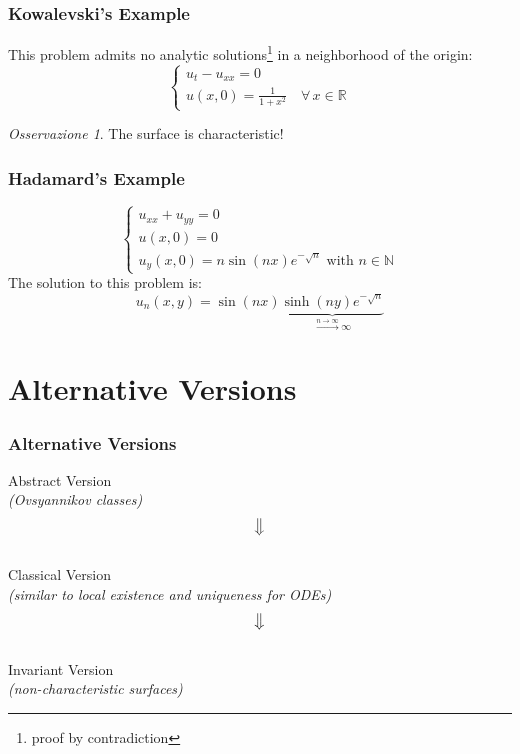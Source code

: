 \documentclass[serif,notheorems]{beamer}
\theoremstyle{definition} %
\theoremstyle{remark}
\newtheorem*{remark}{Osservazione}
\begin{document}
\begin{frame}
\frametitle{Kowalevski's Example} 
This problem admits no analytic solutions\footnote{proof by contradiction} in a neighborhood of the origin:
\begin{equation*}
\begin{cases}
u_t-u_{xx}=0\\
u(x,0)=\frac{1}{1+x^2} \quad \forall \, x \in \mathbb{R}
\end{cases}
\end{equation*}
\begin{remark}
The surface is characteristic!
\end{remark}
\end{frame}

\begin{frame}
\frametitle{Hadamard's Example}
\begin{equation*}
\begin{cases}
u_{xx}+u_{yy}=0\\
u(x,0)=0\\ 
u_y(x,0)=n\sin(nx)e^{-\sqrt{n}} \text{ with } n\in\mathbb{N}
\end{cases}
\end{equation*}
The solution to this problem is:
$$u_n(x,y)=\sin(nx) \underbrace{\sinh(ny)e^{-\sqrt{n}}}_{\xrightarrow{n\rightarrow\infty} \infty}$$
\end{frame}

\section{Alternative Versions}

\begin{frame}
\frametitle{Alternative Versions}
\begin{center}
\normalsize Abstract Version \\
\footnotesize\textit{(Ovsyannikov classes)}\\
\normalsize $$\big\Downarrow$$\\
\normalsize Classical Version \\
\footnotesize\textit{(similar to local existence and uniqueness for ODEs)}\\
\normalsize $$\big\Downarrow$$\\
\normalsize Invariant Version \\
\footnotesize\textit{(non-characteristic surfaces)}\\
\end{center}
\end{frame}
\end{document}
